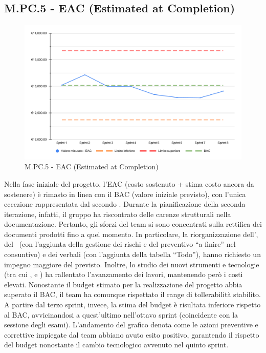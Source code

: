 \subsection{M.PC.5 - EAC (Estimated at Completion)}
\begin{figure}[H]
    \centering
    \includegraphics[width=\textwidth]{assets/stima_a_finire.pdf}
    \caption{M.PC.5 - EAC (Estimated at Completion)}
\end{figure}

\par Nella fase iniziale del progetto, l'EAC (costo sostenuto + stima costo ancora da sostenere) è rimasto in linea con il BAC (valore iniziale previsto), con l’unica eccezione rappresentata dal secondo . Durante la pianificazione della seconda iterazione, infatti, il gruppo ha riscontrato delle carenze strutturali nella documentazione. Pertanto, gli sforzi del team si sono concentrati sulla rettifica dei documenti prodotti fino a quel momento. In particolare, la riorganizzazione dell'\AdR, del \PdP\ (con l'aggiunta della gestione dei rischi e del preventivo “a finire” nel consuntivo) e dei verbali (con l’aggiunta della tabella “Todo”), hanno richiesto un impegno maggiore del previsto. Inoltre, lo studio dei nuovi strumenti e tecnologie (tra cui ,  e ) ha rallentato l’avanzamento dei lavori, mantenendo però i costi elevati. Nonostante il budget stimato per la realizzazione del progetto abbia superato il BAC, il team ha comunque rispettato il range di tollerabilità stabilito. A partire dal terzo sprint, invece, la stima del budget è risultata inferiore rispetto al BAC, avvicinandosi a quest’ultimo nell’ottavo sprint (coincidente con la sessione degli esami). L’andamento del grafico denota come le azioni preventive e correttive impiegate dal team abbiano avuto esito positivo, garantendo il rispetto del budget nonostante il cambio tecnologico avvenuto nel quinto sprint.